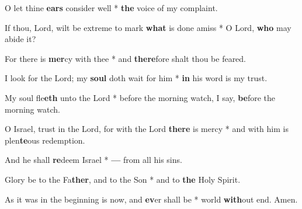 \begin{multicols}{2}
	O let thine \textbf{ears} consider well * \textbf{the} voice of my complaint.
	
	If thou, Lord, wilt be extreme to mark \textbf{what} is done amiss * O Lord, \textbf{who} may abide it?
	
	For there is \textbf{mer}cy with thee * and \textbf{there}fore shalt thou be feared.
	
	I look for the Lord; my \textbf{soul} doth wait for him * \textbf{in} his word is my trust.
	
	My soul fle\textbf{eth} unto the Lord * before the morning watch, I say, \textbf{be}fore the morning watch.
	
	O Israel, trust in the Lord, for with the Lord \textbf{there} is mercy * and with him is plen\textbf{te}ous redemption.
	
	And he shall \textbf{re}deem Israel * \textbf{---} from all his sins.
	
	Glory be to the Fa\textbf{ther}, and to the Son * and to \textbf{the} Holy Spirit.
	
	As it was in the beginning is now, and \textbf{ev}er shall be * world \textbf{with}out end. Amen.
\end{multicols}